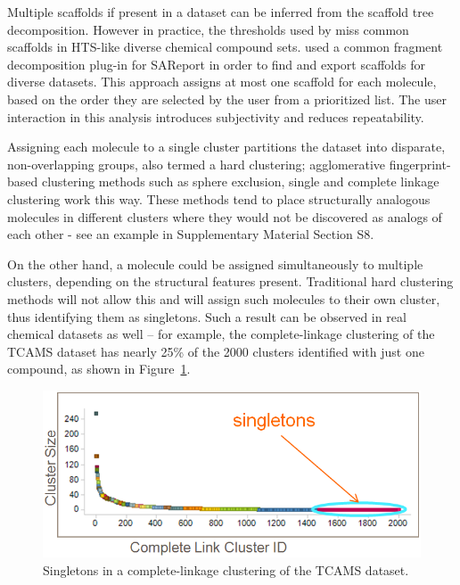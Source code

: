 \documentclass[journal=jacsat,biochem,manuscript=article]{achemso}
\newcommand*\fref[1]{Figure~\ref{fig:#1}}
\begin{document}

Multiple scaffolds if present in a dataset can be inferred from the
scaffold tree decomposition\cite{ClarkLabute2008SAReport}. However in
practice, the thresholds used by \citet{ClarkLabute2008SAReport}
miss common scaffolds in HTS-like diverse chemical compound
sets. \citet{Bandyopadhyay2012ACS} used a common fragment
decomposition plug-in for SAReport in order to find and export
scaffolds for diverse datasets.  This approach assigns at most one scaffold for
each molecule, based on the order they are selected by the user from a
prioritized list.  The user interaction in this analysis introduces subjectivity and
reduces repeatability.

Assigning each molecule to a single cluster partitions the dataset into
disparate, non-overlapping groups, also termed a hard clustering;
agglomerative fingerprint-based clustering methods such as sphere exclusion, single and complete linkage clustering\cite{Downs2003} work this way. These methods tend to place structurally analogous molecules in different clusters where they would not be discovered as analogs of each other - see an example in Supplementary Material Section S8. 

On the other hand, a molecule could be assigned simultaneously to multiple clusters, depending on the structural features present. Traditional
hard clustering methods will not allow this and will assign such molecules
to their own cluster, thus identifying them
as singletons.  Such a result can be observed in real chemical datasets
as well -- for example, the complete-linkage clustering of the TCAMS
dataset\cite{Gamo2010,Calderon2011} has nearly 25\% of the 2000
clusters identified with just one compound, as shown in \fref{platypus}.

\begin{figure}
\includegraphics[width=5.5in]{fig/singletons.png}
\caption{Singletons in a complete-linkage clustering of the TCAMS dataset.}
\label{fig:platypus}
\end{figure}
\end{document}
